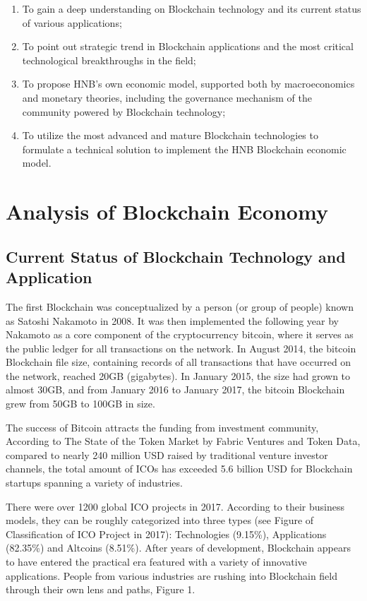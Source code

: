 \documentclass[fleqn,10pt]{SelfArx} %
\begin{document}
\begin{enumerate}[noitemsep] %
\item  To gain a deep understanding on Blockchain technology and its current status of various applications; 
\item  To point out strategic trend in Blockchain applications and the most critical technological breakthroughs in the field;
\item  To propose HNB’s own economic model, supported both by macroeconomics and monetary theories, including the governance mechanism of the community powered by Blockchain technology;
\item  To utilize the most advanced and mature Blockchain technologies to formulate a technical solution to implement the HNB Blockchain economic model.
\end{enumerate}


\section{Analysis of Blockchain Economy}

\subsection{\small Current Status of Blockchain Technology and Application}

The first Blockchain was conceptualized by a person (or group of people) known as Satoshi Nakamoto in 2008. It was then implemented the following year by Nakamoto as a core component of the cryptocurrency bitcoin, where it serves as the public ledger for all transactions on the network. In August 2014, the bitcoin Blockchain file size, containing records of all transactions that have occurred on the network, reached 20GB (gigabytes). In January 2015, the size had grown to almost 30GB, and from January 2016 to January 2017, the bitcoin Blockchain grew from 50GB to 100GB in size.

The success of Bitcoin attracts the funding from investment community, According to The State of the Token Market by Fabric Ventures and Token Data, compared to nearly 240 million USD raised by traditional venture investor channels, the total amount of ICOs has exceeded 5.6 billion USD for Blockchain startups spanning a variety of industries. 

There were over 1200 global ICO projects in 2017. According to their business models, they can be roughly categorized into three types (see Figure of Classification of ICO Project in 2017): Technologies (9.15\%), Applications (82.35\%) and Altcoins (8.51\%). After years of development, Blockchain appears to have entered the practical era featured with a variety of innovative applications. People from various industries are rushing into Blockchain field through their own lens and paths, Figure 1. 
\end{document}

